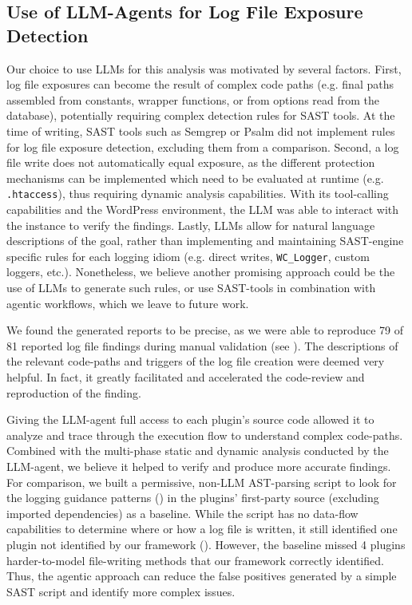 \documentclass[sigconf]{acmart}
\begin{document}
\subsection{Use of LLM-Agents for Log File Exposure Detection}\label{sec:dis:useofllms}
Our choice to use LLMs for this analysis was motivated by several factors. First, log file exposures can become the result of complex code paths (e.g. final paths assembled from constants, wrapper functions, or from options read from the database), potentially requiring complex detection rules for SAST tools. At the time of writing, SAST tools such as Semgrep or Psalm did not implement rules for log file exposure detection, excluding them from a comparison. Second, a log file write does not automatically equal exposure, as the different protection mechanisms can be implemented which need to be evaluated at runtime (e.g. \texttt{.htaccess}), thus requiring dynamic analysis capabilities. With its tool-calling capabilities and the WordPress environment, the LLM was able to interact with the instance to verify the findings. Lastly, LLMs allow for natural language descriptions of the goal, rather than implementing and maintaining SAST-engine specific rules for each logging idiom (e.g. direct writes, \texttt{WC\_Logger}, custom loggers, etc.). Nonetheless, we believe another promising approach could be the use of LLMs to generate such rules, or use SAST-tools in combination with agentic workflows, which we leave to future work. 

We found the generated reports to be precise, as we were able to reproduce 79 of 81 reported log file findings during manual validation (see ).
The descriptions of the relevant code-paths and triggers of the log file creation were deemed very helpful. In fact, it greatly facilitated and accelerated the code-review and reproduction of the finding.

Giving the LLM-agent full access to each plugin's source code allowed it to analyze and trace through the execution flow to understand complex code-paths. 
Combined with the multi-phase static and dynamic analysis conducted by the LLM-agent, we believe it helped to verify and produce more accurate findings. 
For comparison, we built a permissive, non-LLM AST-parsing script to look for the logging guidance patterns () in the plugins' first-party source (excluding imported dependencies) as a baseline. While the script has no data-flow capabilities to determine where or how a log file is written, it still identified one plugin not identified by our framework (). 
However, the baseline missed 4 plugins harder-to-model file-writing methods that our framework correctly identified. Thus, the agentic approach can reduce the false positives generated by a simple SAST script and identify more complex issues.  
\end{document}

